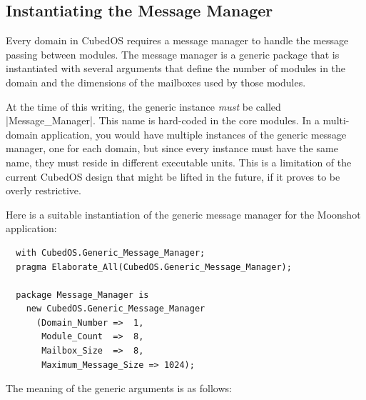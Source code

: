 \subsection{Instantiating the Message Manager}
\label{sec:manual-tutorial-instantiating}

Every domain in CubedOS requires a message manager to handle the message passing between
modules. The message manager is a generic package that is instantiated with several arguments
that define the number of modules in the domain and the dimensions of the mailboxes used by
those modules.

At the time of this writing, the generic instance \emph{must} be called |Message_Manager|. This
name is hard-coded in the core modules. In a multi-domain application, you would have multiple
instances of the generic message manager, one for each domain, but since every instance must
have the same name, they must reside in different executable units. This is a limitation of the
current CubedOS design that might be lifted in the future, if it proves to be overly
restrictive.

Here is a suitable instantiation of the generic message manager for the Moonshot application:

\begin{verbatim}
  with CubedOS.Generic_Message_Manager;
  pragma Elaborate_All(CubedOS.Generic_Message_Manager);
  
  package Message_Manager is
    new CubedOS.Generic_Message_Manager
      (Domain_Number =>  1,
       Module_Count  =>  8,
       Mailbox_Size  =>  8,
       Maximum_Message_Size => 1024);
\end{verbatim}

The meaning of the generic arguments is as follows:

